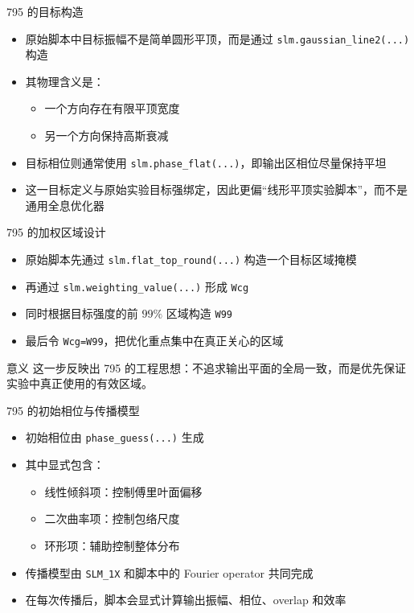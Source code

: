 \documentclass[aspectratio=169,10pt]{ctexbeamer}
\begin{document}
\begin{frame}{795 的目标构造}
  \begin{itemize}
    \item 原始脚本中目标振幅不是简单圆形平顶，而是通过 \texttt{slm.gaussian\_line2(...)} 构造
    \item 其物理含义是：
    \begin{itemize}
      \item 一个方向存在有限平顶宽度
      \item 另一个方向保持高斯衰减
    \end{itemize}
    \item 目标相位则通常使用 \texttt{slm.phase\_flat(...)}，即输出区相位尽量保持平坦
    \item 这一目标定义与原始实验目标强绑定，因此更偏“线形平顶实验脚本”，而不是通用全息优化器
  \end{itemize}
\end{frame}

\begin{frame}{795 的加权区域设计}
  \begin{itemize}
    \item 原始脚本先通过 \texttt{slm.flat\_top\_round(...)} 构造一个目标区域掩模
    \item 再通过 \texttt{slm.weighting\_value(...)} 形成 \texttt{Wcg}
    \item 同时根据目标强度的前 $99\%$ 区域构造 \texttt{W99}
    \item 最后令 \texttt{Wcg=W99}，把优化重点集中在真正关心的区域
  \end{itemize}

  \vspace{0.4em}
  \begin{block}{意义}
    这一步反映出 795 的工程思想：不追求输出平面的全局一致，而是优先保证实验中真正使用的有效区域。
  \end{block}
\end{frame}

\begin{frame}{795 的初始相位与传播模型}
  \begin{itemize}
    \item 初始相位由 \texttt{phase\_guess(...)} 生成
    \item 其中显式包含：
    \begin{itemize}
      \item 线性倾斜项：控制傅里叶面偏移
      \item 二次曲率项：控制包络尺度
      \item 环形项：辅助控制整体分布
    \end{itemize}
    \item 传播模型由 \texttt{SLM\_1X} 和脚本中的 Fourier operator 共同完成
    \item 在每次传播后，脚本会显式计算输出振幅、相位、overlap 和效率
  \end{itemize}
\end{frame}
\end{document}
